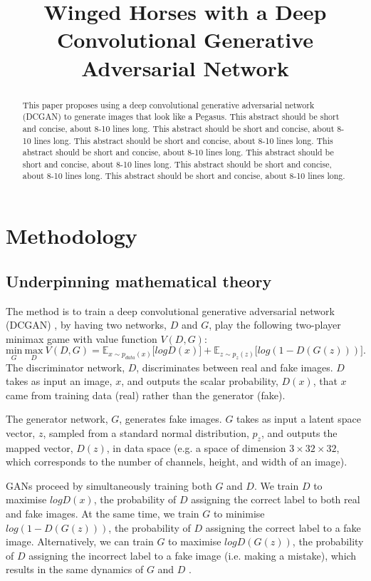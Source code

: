 \documentclass{article}
\title{Winged Horses with a Deep Convolutional Generative Adversarial Network}
\begin{document}
\maketitle
\begin{abstract}
    This paper proposes using a deep convolutional generative adversarial network (DCGAN) to generate images that look like a Pegasus. This abstract should be short and concise, about 8-10 lines long. This abstract should be short and concise, about 8-10 lines long. This abstract should be short and concise, about 8-10 lines long. This abstract should be short and concise, about 8-10 lines long. This abstract should be short and concise, about 8-10 lines long. This abstract should be short and concise, about 8-10 lines long. This abstract should be short and concise, about 8-10 lines long.
\end{abstract}

\section{Methodology}
\subsection{Underpinning mathematical theory}
The method is to train a deep convolutional generative adversarial network (DCGAN) \cite{article}, by having two networks, $D$ and $G$, play the following two-player minimax game with value function $V(D, G)$: 
\begin{equation}
    \underset{G}{\text{min}} \ \underset{D}{\text{max}} \ V(D,G) = \mathbb{E}_{x\sim p_{data}(x)}\big[logD(x)\big] + \mathbb{E}_{z\sim p_{z}(z)}\big[log(1-D(G(z)))\big].
\end{equation}
The discriminator network, $D$, discriminates between real and fake images. $D$ takes as input an image, $x$, and outputs the scalar probability, $D(x)$, that $x$ came from training data (real) rather than the generator (fake). 

The generator network, $G$, generates fake images. $G$ takes as input a latent space vector, $z$, sampled from a standard normal distribution, $p_z$, and outputs the mapped vector, $D(z)$, in data space (e.g. a space of dimension $3 \times 32 \times 32$, which corresponds to the number of channels, height, and width of an image). 

GANs proceed by simultaneously training both $G$ and $D$. We train $D$ to maximise $logD(x)$, the probability of $D$ assigning the correct label to both real and fake images. At the same time, we train $G$ to minimise $log(1-D(G(z)))$, the probability of $D$ assigning the correct label to a fake image. Alternatively, we can train $G$ to maximise $logD(G(z))$, the probability of $D$ assigning the incorrect label to a fake image (i.e. making a mistake), which results in the same dynamics of $G$ and $D$ \cite{NIPS2014_5ca3e9b1}. 
\end{document}
